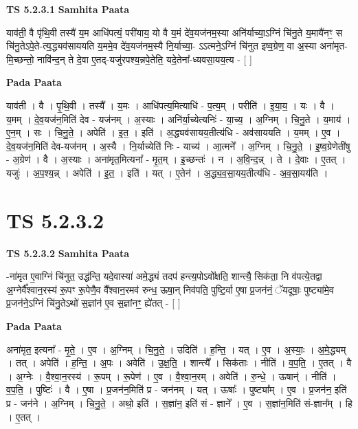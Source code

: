 \documentclass[17pt]{extarticle}
\begin{document}
\textbf{TS 5.2.3.1 } \newline
\textbf{Samhita Paata} \newline

याव॑ती॒ वै पृ॑थि॒वी तस्यै॑ य॒म आधि॑पत्यं॒ परी॑याय॒ यो वै य॒मं दे॑व॒यज॑नम॒स्या अनि॑र्याच्या॒ऽग्निं चि॑नु॒ते य॒मायै॑नꣳ॒॒ स चि॑नु॒तेऽपे॒ते-त्य॒द्ध्यव॑साययति य॒ममे॒व दे॑व॒यज॑नम॒स्यै नि॒र्याच्या॒- ऽऽत्मने॒ऽग्निं चि॑नुत इष्व॒ग्रेण॒ वा अ॒स्या अना॑मृत-मि॒च्छन्तो॒ नावि॑न्द॒न् ते दे॒वा ए॒तद्-यजु॑रपश्य॒न्नपे॒तेति॒ यदे॒तेना᳚-ध्यवसा॒यय॒त्य - [  ] \newline

\textbf{Pada Paata} \newline

याव॑ती । वै । पृ॒थि॒वी । तस्यै᳚ । य॒मः । आधि॑पत्य॒मित्याधि॑ - प॒त्य॒म् । परीति॑ । इ॒या॒य॒ । यः । वै । य॒मम् । दे॒व॒यज॑न॒मिति॑ देव - यज॑नम् । अ॒स्याः । अनि॑र्या॒च्येत्यनिः॑ - या॒च्य॒ । अ॒ग्निम् । चि॒नु॒ते । य॒माय॑ । ए॒न॒म् । सः । चि॒नु॒ते॒ । अपेति॑ । इ॒त॒ । इति॑ । अ॒द्ध्यव॑सायय॒तीत्य॑धि - अव॑साययति । य॒मम् । ए॒व । दे॒व॒यज॑न॒मिति॑ देव-यज॑नम् । अ॒स्यै । नि॒र्याच्येति॑ निः - याच्य॑ । आ॒त्मने᳚ । अ॒ग्निम् । चि॒नु॒ते॒ । इ॒ष्व॒ग्रेणेती॑षु - अ॒ग्रेण॑ । वै । अ॒स्याः । अना॑मृत॒मित्यना᳚ - मृ॒त॒म् । इ॒च्छन्तः॑ । न । अ॒वि॒न्द॒न्न् । ते । दे॒वाः । ए॒तत् । यजुः॑ । अ॒प॒श्य॒न्न् । अपेति॑ । इ॒त॒ । इति॑ । यत् । ए॒तेन॑ । अ॒द्ध्य॒व॒सा॒यय॒तीत्य॑धि - अ॒व॒सा॒यय॑ति ।  \newline




\section*{ TS 5.2.3.2 }

\textbf{TS 5.2.3.2 } \newline
\textbf{Samhita Paata} \newline

-ना॑मृत ए॒वाग्निं चि॑नुत॒ उद्ध॑न्ति॒ यदे॒वास्या॑ अमे॒द्ध्यं तदप॑ हन्त्य॒पोऽवो᳚क्षति॒ शान्त्यै॒ सिक॑ता॒ नि व॑पत्ये॒तद्वा अ॒ग्नेर्वै᳚श्वान॒रस्य॑ रू॒पꣳ रू॒पेणै॒व वै᳚श्वान॒रमव॑ रुन्ध॒ ऊषा॒न् निव॑पति॒ पुष्टि॒र्वा ए॒षा प्र॒जन॑नं॒ ॅयदूषाः॒ पुष्ट्या॑मे॒व प्र॒जन॑ने॒ऽग्निं चि॑नु॒तेऽथो॑ स॒ज्ञांन॑ ए॒व स॒ज्ञांनꣳ॒॒ ह्ये॑तत् - [  ] \newline

\textbf{Pada Paata} \newline

अना॑मृत॒ इत्यना᳚ - मृ॒ते॒ । ए॒व । अ॒ग्निम् । चि॒नु॒ते॒ । उदिति॑ । ह॒न्ति॒ । यत् । ए॒व । अ॒स्याः॒ । अ॒मे॒द्ध्यम् । तत् । अपेति॑ । ह॒न्ति॒ । अ॒पः । अवेति॑ । उ॒क्ष॒ति॒ । शान्त्यै᳚ । सिक॑ताः । नीति॑ । व॒प॒ति॒ । ए॒तत् । वै । अ॒ग्नेः । वै॒श्वा॒न॒रस्य॑ । रू॒पम् । रू॒पेण॑ । ए॒व । वै॒श्वा॒न॒रम् । अवेति॑ । रु॒न्धे॒ । ऊषान्॑ । नीति॑ । व॒प॒ति॒ । पुष्टिः॑ । वै । ए॒षा । प्र॒जन॑न॒मिति॑ प्र - जन॑नम् । यत् । ऊषाः᳚ । पुष्ट्या᳚म् । ए॒व । प्र॒जन॑न॒ इति॑ प्र - जन॑ने । अ॒ग्निम् । चि॒नु॒ते॒ । अथो॒ इति॑ । स॒ज्ञांन॒ इति॑ सं - ज्ञाने᳚ । ए॒व । स॒ज्ञांन॒मिति॑ सं-ज्ञान᳚म् । हि । ए॒तत् ।  \newline
\end{document}
